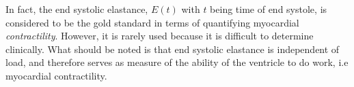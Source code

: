 In fact, the end systolic elastance, $E(t)$ with $t$ being time of end
systole, is considered to be the gold
standard in terms of quantifying myocardial \emph{contractility}.
However, it is rarely used because it is difficult to determine
clinically. What should be noted is that end systolic elastance is
independent of load, and therefore serves as measure of the ability of
the ventricle to do work, i.e myocardial contractility.







% 
















